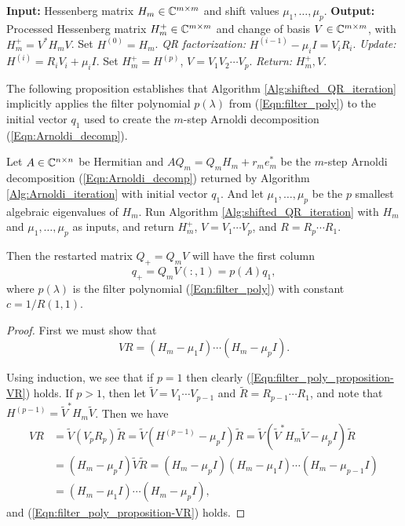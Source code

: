 \begin{enumerate}
\begin{algorithm}[H]
\begin{algorithmic}[1]
	\Statex 	\textbf{Input:} Hessenberg matrix $H_m \in {\mathbb C}^{m \times m}$ and shift values $\mu_1, \ldots, \mu_p$.
	\Statex 	\textbf{Output:} Processed Hessenberg matrix $H_m^+ \in {\mathbb C}^{m \times m}$ and change of basis $V \in {\mathbb C}^{m \times m}$, with $H_m^+ = V^*H_mV$.
	\State		Set $H^{(0)} = H_m$.
		\State		\textit{QR factorization:} $H^{(i-1)} - \mu_i I = V_iR_i$.
		\State		\textit{Update:} $H^{(i)} = R_iV_i + \mu_iI$.
	\EndFor
	\State		Set $H_m^+ = H^{(p)}$, $V = V_1  V_2 \cdots V_p$.
	\State		\textit{Return:} $H_m^+, V$.
\end{algorithmic}

\end{algorithm}

The following proposition establishes that Algorithm \ref{Alg:shifted_QR_iteration} implicitly applies the filter polynomial $p(\lambda)$ from (\ref{Eqn:filter_poly}) to the initial vector $q_1$ used to create the $m$-step Arnoldi decomposition (\ref{Eqn:Arnoldi_decomp}).

\begin{prop}
Let $A \in {\mathbb C}^{n \times n}$ be Hermitian and $AQ_m = Q_mH_m + r_me_m^*$ be the $m$-step Arnoldi decomposition (\ref{Eqn:Arnoldi_decomp}) returned by Algorithm \ref{Alg:Arnoldi_iteration} with initial vector $q_1$.  And let $\mu_1, \ldots, \mu_p$ be the $p$ smallest algebraic eigenvalues of $H_m$.  Run Algorithm \ref{Alg:shifted_QR_iteration} with $H_m$ and $\mu_1, \ldots, \mu_p$ as inputs, and return $H_m^+$, $V = V_1 \cdots V_p$, and $R = R_p \cdots R_1$.

Then the restarted matrix $Q_+ = Q_mV$ will have the first column
\[
q_+ = Q_mV(:,1) = p(A)q_1,
\]
where $p(\lambda)$ is the filter polynomial (\ref{Eqn:filter_poly}) with constant $c = 1/R(1,1)$.
\end{prop}

\begin{proof}
First we must show that 
\begin{equation} 		\label{Eqn:filter_poly_proposition-VR}
VR = (H_m - \mu_1I) \cdots (H_m - \mu_pI).
\end{equation}

Using induction, we see that if $p=1$ then clearly (\ref{Eqn:filter_poly_proposition-VR}) holds.  If $p>1$, then let $\tilde{V}=V_1 \cdots V_{p-1}$ and $\tilde{R} = R_{p-1} \cdots R_1$, and note that $H^{(p-1)} = \tilde{V}^*H_m\tilde{V}$.  Then we have
\[
\begin{split}
VR & = \tilde{V}(V_pR_p)\tilde{R} 
	= \tilde{V} \left( H^{(p-1)} - \mu_pI \right) \tilde{R}
	= \tilde{V}\left( \tilde{V}^*H_m \tilde{V} - \mu_p I \right)\tilde{R}	\\
	& = \left(H_m - \mu_p I \right) \tilde{V}\tilde{R}
	= (H_m - \mu_p I) (H_m - \mu_1 I) \cdots (H_m - \mu_{p-1}I) 	\\
	&=  (H_m - \mu_1I) \cdots (H_m - \mu_pI),
\end{split}
\]
and (\ref{Eqn:filter_poly_proposition-VR}) holds.


\end{proof}
\end{enumerate}
